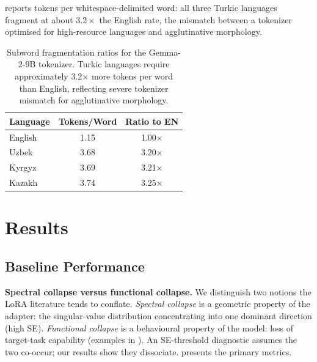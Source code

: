 \documentclass[11pt]{article}
\begin{document}
 reports tokens per whitespace-delimited word: all three Turkic languages fragment at about $3.2\times$ the English rate, the mismatch between a tokenizer optimised for high-resource languages and agglutinative morphology.

\begin{table}[!htbp]
\centering
\small
\begin{tabular}{lcc}
\toprule
\textbf{Language} & \textbf{Tokens/Word} & \textbf{Ratio to EN} \\
\midrule
English & 1.15 & 1.00$\times$ \\
Uzbek & 3.68 & 3.20$\times$ \\
Kyrgyz & 3.69 & 3.21$\times$ \\
Kazakh & 3.74 & 3.25$\times$ \\
\bottomrule
\end{tabular}
\caption{Subword fragmentation ratios for the Gemma-2-9B tokenizer. Turkic languages require approximately 3.2$\times$ more tokens per word than English, reflecting severe tokenizer mismatch for agglutinative morphology.}
\label{tab:tokenization}
\end{table}

\section{Results}

\subsection{Baseline Performance}

\textbf{Spectral collapse versus functional collapse.} We distinguish two notions the LoRA literature tends to conflate. \emph{Spectral collapse} is a geometric property of the adapter: the singular-value distribution concentrating into one dominant direction (high SE). \emph{Functional collapse} is a behavioural property of the model: loss of target-task capability (examples in ). An SE-threshold diagnostic assumes the two co-occur; our results show they dissociate.  presents the primary metrics.
\end{document}
